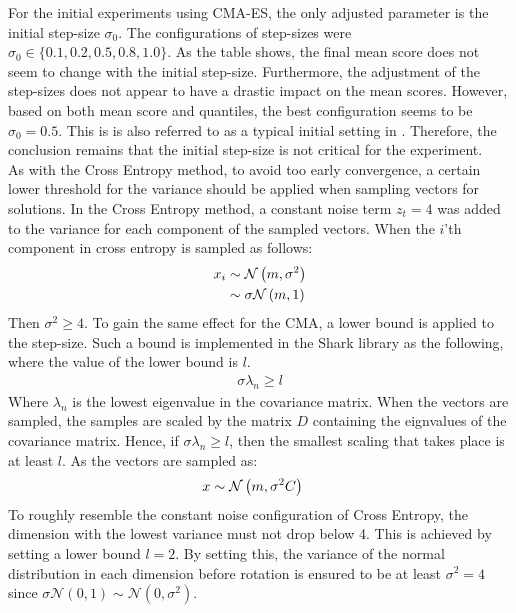 For the initial experiments using CMA-ES, 
the only adjusted parameter is the initial 
step-size $\sigma_0$. The configurations of step-sizes were 
$\sigma_0 \in \{0.1, 0.2, 0.5, 0.8, 1.0\}$. As the table shows,
the final mean score does not seem to change with the initial step-size.
Furthermore, the adjustment of the step-sizes does not appear to 
have a drastic impact on the mean scores. However, based on both mean score and
quantiles, the best configuration seems to be $\sigma_0 = 0.5$. This is 
is also referred to as a typical initial setting in \citep{boumaza2009}.
Therefore, the conclusion remains that the initial step-size is not critical 
for the experiment.\\

As with the Cross Entropy method, to avoid too early convergence, a 
certain lower threshold for the variance should be applied when 
sampling vectors for solutions. In the Cross Entropy method, a constant 
noise term $z_t = 4$ was added to the variance for each component
of the sampled vectors. When the $i$'th component in cross entropy is
sampled as follows:
\begin{align*}
x_i &\sim \mathcal{N}\left(m, \sigma^{2}\right)\\
              &\sim \sigma \mathcal{N}\left(m, 1\right)
\end{align*}
Then $\sigma^{2} \geq 4$. To gain the same effect for the CMA, a lower bound 
is applied to the step-size. Such a bound is implemented in the Shark library
as the following, where the value of the lower bound is $l$.
\begin{align*}
\sigma  \lambda_n \geq l
\end{align*}
Where $\lambda_n$ is the lowest eigenvalue in the covariance matrix. 
When the vectors are sampled, the samples are scaled by the matrix $D$
containing the eignvalues of the covariance matrix. 
Hence, if $\sigma \lambda_n \geq l$, then the smallest scaling
that takes place is at least $l$. As the vectors are sampled
as: 
\begin{align*}
x &\sim \mathcal{N}\left( m, \sigma^{2}C \right)
\end{align*}
To roughly resemble the constant noise configuration of Cross Entropy,
the dimension with the lowest variance must not drop below 4. 
This is achieved by setting a lower bound $l=2$. By setting this, 
the variance of the normal distribution in each dimension 
before rotation is ensured to be at least $\sigma^{2} = 4$
since $\sigma \mathcal{N}\left( 0, 1 \right) \sim 
\mathcal{N}\left( 0, \sigma^{2} \right)$.



